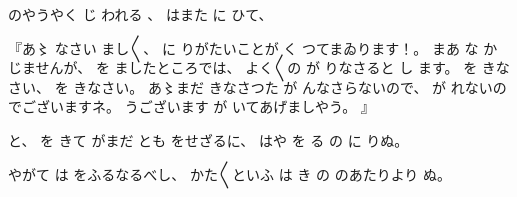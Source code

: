 %
のやうやく
じ
われる
、
%
はまた
に
ひて、

%
『あ〻
なさい
まし〳〵、
%
に
りがたいことが
く
つてまゐります！。
%
まあ
な
か
じませんが、
%
を
ましたところでは、
%
よく〳〵の
が
りなさると
し
ます。
%
を
きなさい、
%
を
きなさい。
%
あ〻まだ
きなさつた
が
んなさらないので、
%
が
れないのでございますネ。
%
うございます
が
いてあげましやう。
』

%
と、
%
を
きて
がまだ
とも
をせざるに、
%
はや
を
る
の
に
りぬ。

%
やがて
は
をふるなるべし、
%
かた〳〵といふ
は
き
の
のあたりより
ぬ。
